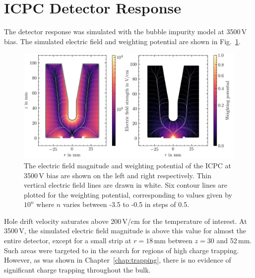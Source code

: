 \section{ICPC Detector Response} \label{sec:ic_sims}
The detector response was simulated with the bubble impurity model at 3500\,V bias. The simulated electric field and weighting potential are shown in Fig.~\ref{fig:icpc_fields}.
\begin{figure}[htb]
    \centering
    \includegraphics[width=6in]{figs/sim/icpc_fields_3500V.png}
    \caption{The electric field magnitude and weighting potential of the ICPC at 3500\,V bias are shown on the left and right respectively. Thin vertical electric field lines are drawn in white. Six contour lines are plotted for the weighting potential, corresponding to values given by $10^n$ where $n$ varies between -3.5 to -0.5 in steps of 0.5.}
    \label{fig:icpc_fields}
\end{figure}

Hole drift velocity saturates above 200\,V/cm for the temperature of interest. At 3500\,V, the simulated electric field magnitude is above this value for almost the entire detector, except for a small strip at $r = 18$\,mm between $z = 30$ and 52\,mm. Such areas were targeted to in the search for regions of high charge trapping. However, as was shown in Chapter~\ref{chap:trapping}, there is no evidence of significant charge trapping throughout the bulk.  

